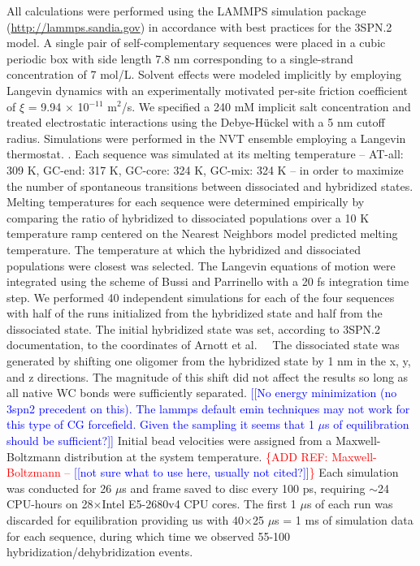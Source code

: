 \documentclass[journal=jpcbfk,manuscript=article]{achemso}
\newcommand*{\addref}[1]{\textcolor{red}{\{ADD REF: #1\}}}
\newcommand*{\noteb}[1]{\textcolor{blue}{[[#1]]}}		%
\begin{document}
All calculations were performed using the LAMMPS simulation package (\url{http://lammps.sandia.gov}) in accordance with best practices for the 3SPN.2 model. \citep{Plimpton1997Short-RangeDynamics} A single pair of self-complementary sequences were placed in a cubic periodic box with side length 7.8 nm corresponding to a single-strand concentration of 7 mol/L. Solvent effects were modeled implicitly by employing Langevin dynamics \citep{DunwegB.Paul1991BrownianNumbers.} with an experimentally motivated per-site friction coefficient of $\xi$ = 9.94 $\times$ 10$^{-11}$ m$^2$/s. \citep{Nkodo2001DiffusionElectrophoresis, Hinckley2013AnHybridization} We specified a 240 mM implicit salt concentration and treated electrostatic interactions using the Debye-H{\"u}ckel with a 5 nm cutoff radius. \citep{Debye1923ZurElektrolyte} Simulations were performed in the NVT ensemble employing a Langevin thermostat. \citep{Schneider1978Molecular-dynamicsTransitions}. Each sequence was simulated at its melting temperature -- AT-all: 309 K, GC-end: 317 K, GC-core: 324 K, GC-mix: 324 K -- in order to maximize the number of spontaneous transitions between dissociated and hybridized states. Melting temperatures for each sequence were determined empirically by comparing the ratio of hybridized to dissociated populations over a 10 K temperature ramp centered on the Nearest Neighbors model predicted melting temperature. The temperature at which the hybridized and dissociated populations were closest was selected. The Langevin equations of motion were integrated using the scheme of Bussi and Parrinello \citep{Bussi2007AccurateDynamics} with a 20 fs integration time step. We performed 40 independent simulations for each of the four sequences with half of the runs initialized from the hybridized state and half from the dissociated state. The initial hybridized state was set, according to 3SPN.2 documentation, to the coordinates of Arnott et al.\ ~\citep{Arnott1976CRCBiology} The dissociated state was generated by shifting one oligomer from the hybridized state by 1 nm in the x, y, and z directions. The magnitude of this shift did not affect the results so long as all native WC bonds were sufficiently separated. \noteb{No energy minimization (no 3spn2 precedent on this). The lammps default emin techniques may not work for this type of CG forcefield. Given the sampling it seems that  1 $\mu$s of equilibration should be sufficient?} Initial bead velocities were assigned from a Maxwell-Boltzmann distribution at the system temperature. \addref{Maxwell-Boltzmann -- \noteb{not sure what to use here, usually not cited?}} Each simulation was conducted for 26 $\mu$s and frame saved to disc every 100 ps, requiring $\sim$24 CPU-hours on 28$\times$Intel E5-2680v4 CPU cores. The first 1 $\mu$s of each run was discarded for equilibration providing us with 40$\times$25 $\mu$s = 1 ms of simulation data for each sequence, during which time we observed 55-100 hybridization/dehybridization events.
\end{document}
